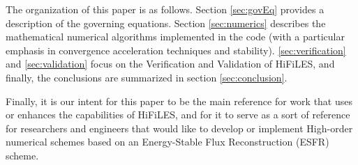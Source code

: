 The organization of this paper is as follows. Section \ref{sec:govEq} provides a description of the governing equations. Section \ref{sec:numerics} describes the mathematical numerical algorithms implemented in the code (with a particular emphasis in convergence acceleration techniques and stability). \ref{sec:verification} and \ref{sec:validation} focus on the Verification and Validation of HiFiLES, and finally, the conclusions are summarized in section \ref{sec:conclusion}.

Finally, it is our intent for this paper to be the main reference for work that uses or enhances the capabilities of HiFiLES, and for it to serve as a sort of reference for researchers and engineers that would like to develop or implement High-order numerical schemes based on an Energy-Stable Flux Reconstruction (ESFR) scheme. 